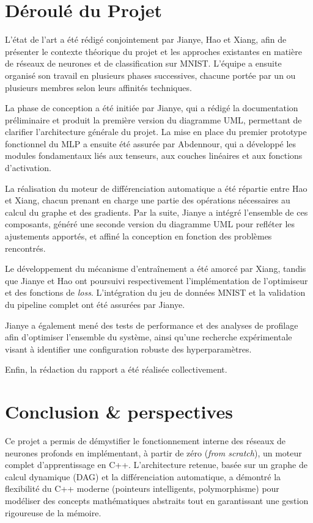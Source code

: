 \documentclass[a4paper,11pt]{article}
\begin{document}
\section{Déroulé du Projet}
L'état de l'art a été rédigé conjointement par Jianye, Hao et Xiang, afin de présenter le contexte théorique du projet et les approches existantes en matière de réseaux de neurones et de classification sur MNIST. L'équipe a ensuite organisé son travail en plusieurs phases successives, chacune portée par un ou plusieurs membres selon leurs affinités techniques.

La phase de conception a été initiée par Jianye, qui a rédigé la documentation préliminaire et produit la première version du diagramme UML, permettant de clarifier l'architecture générale du projet. La mise en place du premier prototype fonctionnel du MLP a ensuite été assurée par Abdennour, qui a développé les modules fondamentaux liés aux tenseurs, aux couches linéaires et aux fonctions d'activation.

La réalisation du moteur de différenciation automatique a été répartie entre Hao et Xiang, chacun prenant en charge une partie des opérations nécessaires au calcul du graphe et des gradients. Par la suite, Jianye a intégré l'ensemble de ces composants, généré une seconde version du diagramme UML pour refléter les ajustements apportés, et affiné la conception en fonction des problèmes rencontrés.

Le développement du mécanisme d'entraînement a été amorcé par Xiang, tandis que Jianye et Hao ont poursuivi respectivement l'implémentation de l'optimiseur et des fonctions de \textit{loss}. L'intégration du jeu de données MNIST et la validation du pipeline complet ont été assurées par Jianye.

Jianye a également mené des tests de performance et des analyses de profilage afin d'optimiser l'ensemble du système, ainsi qu'une recherche expérimentale visant à identifier une configuration robuste des hyperparamètres.

Enfin, la rédaction du rapport a été réalisée collectivement.

\section{Conclusion \& perspectives}
Ce projet a permis de démystifier le fonctionnement interne des réseaux de neurones profonds en implémentant, à partir de zéro (\textit{from scratch}), un moteur complet d'apprentissage en C++. L'architecture retenue, basée sur un graphe de calcul dynamique (DAG) et la différenciation automatique, a démontré la flexibilité du C++ moderne (pointeurs intelligents, polymorphisme) pour modéliser des concepts mathématiques abstraits tout en garantissant une gestion rigoureuse de la mémoire.
\end{document}
